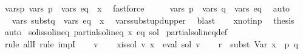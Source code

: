 \begin{isabellebody}
\ vars{\isacharunderscore}{\kern0pt}p{\isacharcolon}{\kern0pt}\ {\isachardoublequoteopen}vars\ p\ {\isasymsubseteq}\ vars\ eq\ {\isacharminus}{\kern0pt}\ {\isacharbraceleft}{\kern0pt}x{\isacharbraceright}{\kern0pt}{\isachardoublequoteclose}\ \isamarkupfalse%
\ fastforce\isanewline
\ \ \isamarkupfalse%
\ \isamarkupfalse%
\ {\isachardoublequoteopen}vars\ p\ {\isasymunion}\ vars\ q\ {\isasymsubseteq}\ vars\ eq{\isachardoublequoteclose}\ \isamarkupfalse%
\ auto\isanewline
\ \ \isamarkupfalse%
\ \isamarkupfalse%
\ {\isachardoublequoteopen}vars\ {\isacharquery}{\kern0pt}subst{\isacharunderscore}{\kern0pt}q\ {\isasymsubseteq}\ vars\ eq\ {\isacharminus}{\kern0pt}\ {\isacharbraceleft}{\kern0pt}x{\isacharbraceright}{\kern0pt}{\isachardoublequoteclose}\ \isamarkupfalse%
\ vars{\isacharunderscore}{\kern0pt}subst{\isacharunderscore}{\kern0pt}upd{\isacharunderscore}{\kern0pt}upper\ \isamarkupfalse%
\ blast\isanewline
\ \ \isamarkupfalse%
\ x{\isacharunderscore}{\kern0pt}not{\isacharunderscore}{\kern0pt}in{\isacharunderscore}{\kern0pt}p\ \isamarkupfalse%
\ {\isacharquery}{\kern0pt}thesis\ \isamarkupfalse%
\ auto\isanewline
{}\isamarkupfalse%
%
\endisatagproof
{\isafoldproof}%
%
\isadelimproof
\isanewline
%
\endisadelimproof
\isanewline
{}\isamarkupfalse%
\ sol{\isacharunderscore}{\kern0pt}is{\isacharunderscore}{\kern0pt}sol{\isacharunderscore}{\kern0pt}ineq{\isacharcolon}{\kern0pt}\ {\isachardoublequoteopen}partial{\isacharunderscore}{\kern0pt}sol{\isacharunderscore}{\kern0pt}ineq\ x\ eq\ sol{\isachardoublequoteclose}\isanewline
%
\isadelimproof
%
\endisadelimproof
%
\isatagproof
{}\isamarkupfalse%
\ partial{\isacharunderscore}{\kern0pt}sol{\isacharunderscore}{\kern0pt}ineq{\isacharunderscore}{\kern0pt}def\ \isamarkupfalse%
\ {\isacharparenleft}{\kern0pt}rule\ allI{\isacharcomma}{\kern0pt}\ rule\ impI{\isacharparenright}{\kern0pt}\isanewline
\ \ \isamarkupfalse%
\ v\isanewline
\ \ \isamarkupfalse%
\ x{\isacharunderscore}{\kern0pt}is{\isacharunderscore}{\kern0pt}sol{\isacharcolon}{\kern0pt}\ {\isachardoublequoteopen}v\ x\ {\isacharequal}{\kern0pt}\ eval\ sol\ v{\isachardoublequoteclose}\isanewline
\ \ \isamarkupfalse%
\ {\isacharquery}{\kern0pt}r\ {\isacharequal}{\kern0pt}\ {\isachardoublequoteopen}subst\ {\isacharparenleft}{\kern0pt}Var\ {\isacharparenleft}{\kern0pt}x\ {\isacharcolon}{\kern0pt}{\isacharequal}{\kern0pt}\ p{\isacharparenright}{\kern0pt}{\isacharparenright}{\kern0pt}\ q{\isachardoublequoteclose}\isanewline

\end{isabellebody}
